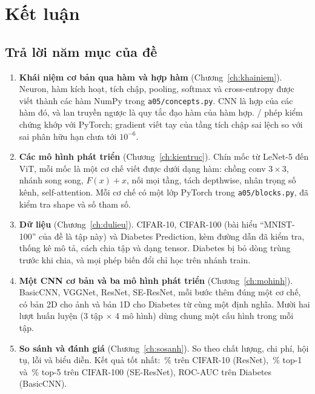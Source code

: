 \chapter{Kết luận}
\label{ch:ketluan}

\section{Trả lời năm mục của đề}

\begin{enumerate}
  \item \textbf{Khái niệm cơ bản qua hàm và hợp hàm} (Chương~\ref{ch:khainiem}). Neuron, hàm kích hoạt, tích chập, pooling,
        softmax và cross-entropy được viết thành các hàm NumPy trong \texttt{a05/concepts.py}. CNN là hợp của các hàm đó, và
        lan truyền ngược là quy tắc đạo hàm của hàm hợp. / phép kiểm chứng
        khớp với PyTorch; gradient viết tay của tầng tích chập sai lệch so với sai phân hữu hạn chưa tới $10^{-6}$.
  \item \textbf{Các mô hình phát triển} (Chương~\ref{ch:kientruc}). Chín mốc từ LeNet-5 đến ViT, mỗi mốc là một cơ chế viết
        được dưới dạng hàm: chồng conv $3\times3$, nhánh song song, $F(x)+x$, nối mọi tầng, tách depthwise, nhân trọng số kênh,
        self-attention. Mỗi cơ chế có một lớp PyTorch trong \texttt{a05/blocks.py}, đã kiểm tra shape và số tham số.
  \item \textbf{Dữ liệu} (Chương~\ref{ch:dulieu}). CIFAR-10, CIFAR-100 (bài hiểu ``MNIST-100'' của đề là tập này) và Diabetes
        Prediction, kèm đường dẫn đã kiểm tra, thống kê mô tả, cách chia tập và dạng tensor. Diabetes bị bỏ
         dòng trùng trước khi chia, và mọi phép biến đổi chỉ học trên nhánh train.
  \item \textbf{Một CNN cơ bản và ba mô hình phát triển} (Chương~\ref{ch:mohinh}). BasicCNN, VGGNet, ResNet, SE-ResNet, mỗi
        bước thêm đúng một cơ chế, có bản 2D cho ảnh và bản 1D cho Diabetes từ cùng một định nghĩa. Mười hai lượt huấn luyện
        (3 tập $\times$ 4 mô hình) dùng chung một cấu hình trong mỗi tập.
  \item \textbf{So sánh và đánh giá} (Chương~\ref{ch:sosanh}). So theo chất lượng, chi phí, hội tụ, lỗi và biểu diễn. Kết quả
        tốt nhất: \,\% trên CIFAR-10 (ResNet), \,\% top-1 và
        \,\% top-5 trên CIFAR-100 (SE-ResNet), ROC-AUC 
        trên Diabetes (BasicCNN).
\end{enumerate}

